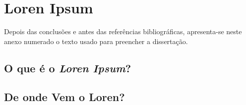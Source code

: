 \chapter{Loren Ipsum} \label{ap1:loren}

Depois das conclusões e antes das referências bibliográficas,
apresenta-se neste anexo numerado o texto usado para preencher a
dissertação.

\section{O que é o \emph{Loren Ipsum}?}


\section{De onde Vem o Loren?}
